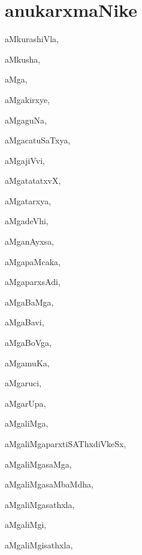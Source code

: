 \chapter*{anukarxmaNike}


\begin{multicols}{3}
{\small
\noindent
{aMkurashiVla}, \pageref{aMkurashiVla}

\noindent
{aMkusha}, \pageref{aMkusha}

\noindent
{aMga}, \pageref{aMga}

\noindent
{aMgakirxye}, \pageref{aMgakirxye}

\noindent
{aMgaguNa}, \pageref{aMgaguNa}

\noindent
{aMgacatuSaTxya}, \pageref{aMgacatuSaTxya}

\noindent
{aMgajiVvi}, \pageref{aMgajiVvi}

\noindent
{aMgatatatxvX}, \pageref{aMgatatatxvX}

\noindent
{aMgatarxya}, \pageref{aMgatarxya}

\noindent
{aMgadeVhi}, \pageref{aMgadeVhi}

\noindent
{aMganAyxsa}, \pageref{aMganAyxsa}

\noindent
{aMgapaMcaka}, \pageref{aMgapaMcaka}

\noindent
{aMgaparxsAdi}, \pageref{aMgaparxsAdi}

\noindent
{aMgaBaMga}, \pageref{aMgaBaMga}

\noindent
{aMgaBavi}, \pageref{aMgaBavi}

\noindent
{aMgaBoVga}, \pageref{aMgaBoVga}

\noindent
{aMgamuKa}, \pageref{aMgamuKa}

\noindent
{aMgaruci}, \pageref{aMgaruci}

\noindent
{aMgarUpa}, \pageref{aMgarUpa}

\noindent
{aMgaliMga}, \pageref{aMgaliMga}

\noindent
{aMgaliMgaparxtiSAThxdiVkeSx}, \pageref{aMgaliMgaparxtiSAThxdiVkeSx}

\noindent
{aMgaliMgasaMga}, \pageref{aMgaliMgasaMga}

\noindent
{aMgaliMgasaMbaMdha}, \pageref{aMgaliMgasaMbaMdha}

\noindent
{aMgaliMgasathxla}, \pageref{aMgaliMgasathxla}

\noindent
{aMgaliMgi}, \pageref{aMgaliMgi}

\noindent
{aMgaliMgisathxla}, \pageref{aMgaliMgisathxla}

}
\end{multicols}

